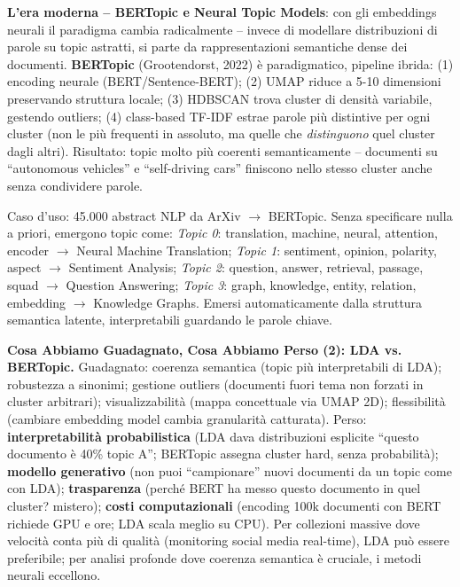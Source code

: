 \documentclass[12pt,a4paper]{article}
\begin{document}
\textbf{L'era moderna -- BERTopic e Neural Topic Models}: con gli embeddings neurali il paradigma cambia radicalmente -- invece di modellare distribuzioni di parole su topic astratti, si parte da rappresentazioni semantiche dense dei documenti. \textbf{BERTopic} (Grootendorst, 2022) \`e paradigmatico, pipeline ibrida: (1) encoding neurale (BERT/Sentence-BERT); (2) UMAP riduce a 5-10 dimensioni preservando struttura locale; (3) HDBSCAN trova cluster di densit\`a variabile, gestendo outliers; (4) class-based TF-IDF estrae parole pi\`u distintive per ogni cluster (non le pi\`u frequenti in assoluto, ma quelle che \emph{distinguono} quel cluster dagli altri). Risultato: topic molto pi\`u coerenti semanticamente -- documenti su ``autonomous vehicles'' e ``self-driving cars'' finiscono nello stesso cluster anche senza condividere parole.

\begin{examplebox}
Caso d'uso: 45.000 abstract NLP da ArXiv $\to$ BERTopic. Senza specificare nulla a priori, emergono topic come: \textit{Topic 0}: translation, machine, neural, attention, encoder $\to$ Neural Machine Translation; \textit{Topic 1}: sentiment, opinion, polarity, aspect $\to$ Sentiment Analysis; \textit{Topic 2}: question, answer, retrieval, passage, squad $\to$ Question Answering; \textit{Topic 3}: graph, knowledge, entity, relation, embedding $\to$ Knowledge Graphs. Emersi automaticamente dalla struttura semantica latente, interpretabili guardando le parole chiave.
\end{examplebox}

\begin{quizbox}
\textbf{Cosa Abbiamo Guadagnato, Cosa Abbiamo Perso (2): LDA vs. BERTopic.}
Guadagnato: coerenza semantica (topic pi\`u interpretabili di LDA); robustezza a sinonimi; gestione outliers (documenti fuori tema non forzati in cluster arbitrari); visualizzabilit\`a (mappa concettuale via UMAP 2D); flessibilit\`a (cambiare embedding model cambia granularit\`a catturata). Perso: \textbf{interpretabilit\`a probabilistica} (LDA dava distribuzioni esplicite ``questo documento \`e 40\% topic A''; BERTopic assegna cluster hard, senza probabilit\`a); \textbf{modello generativo} (non puoi ``campionare'' nuovi documenti da un topic come con LDA); \textbf{trasparenza} (perch\'e BERT ha messo questo documento in quel cluster? mistero); \textbf{costi computazionali} (encoding 100k documenti con BERT richiede GPU e ore; LDA scala meglio su CPU). Per collezioni massive dove velocit\`a conta pi\`u di qualit\`a (monitoring social media real-time), LDA pu\`o essere preferibile; per analisi profonde dove coerenza semantica \`e cruciale, i metodi neurali eccellono.
\end{quizbox}
\end{document}
